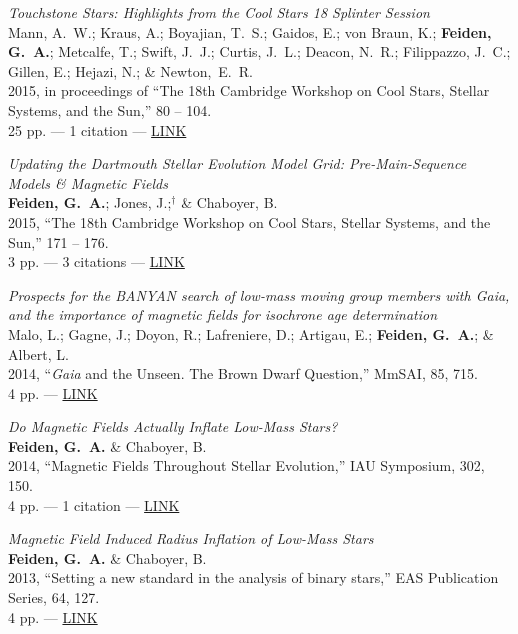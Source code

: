 \documentclass[11pt,a4paper]{article}
\begin{document}
\begin{etaremune}[leftmargin=0.30in]
	\item \emph{Touchstone Stars: Highlights from the Cool Stars 18 Splinter Session} \\
	 Mann, A.~W.; Kraus, A.; Boyajian, T.~S.; Gaidos, E.; von Braun, K.; {\bf Feiden, G.~A.}; Metcalfe, T.; Swift, J.~J.; Curtis, J.~L.; Deacon, N.~R.; Filippazzo, J.~C.; Gillen, E.; Hejazi, N.; \& Newton,~E.~R. \\
	 2015, in proceedings of ``The 18th Cambridge Workshop on Cool Stars, Stellar Systems, and the Sun,'' 80 -- 104. \\
	 25 pp. --- 1 citation --- \href{http://adsabs.harvard.edu/abs/2015csss...18..171F}{LINK}

	\item \emph{Updating the Dartmouth Stellar Evolution Model Grid: Pre-Main-Sequence Models \& Magnetic Fields} \\
	{\bf Feiden, G.~A.}; Jones, J.;$^{\dagger}$ \& Chaboyer, B. \\
	2015, ``The 18th Cambridge Workshop on Cool Stars, Stellar Systems, and the Sun,'' 171 -- 176. \\
	3 pp. --- 3 citations --- \href{http://adsabs.harvard.edu/abs/2015csss...18...80M}{LINK}
	
	\item \emph{Prospects for the BANYAN search of low-mass moving group members with Gaia, and the importance of magnetic fields for isochrone age determination} \\
		Malo, L.; Gagne, J.; Doyon, R.; Lafreniere, D.; Artigau, E.; {\bf Feiden, G.~A.}; \& Albert, L. \\
		2014, ``{\it Gaia} and the Unseen. The Brown Dwarf Question,'' MmSAI, 85, 715. \\
		4 pp. --- \href{http://adsabs.harvard.edu/abs/2014MmSAI..85..715M}{LINK}
		
	\item \emph{Do Magnetic Fields Actually Inflate Low-Mass Stars?} \\
    {\bf Feiden, G.~A.} \& Chaboyer, B. \\
    2014, ``Magnetic Fields Throughout Stellar Evolution,'' IAU Symposium, 302, 150. \\
    4 pp. --- 1 citation --- \href{http://adsabs.harvard.edu/abs/2014IAUS..302..150F}{LINK}

    \item \emph{Magnetic Field Induced Radius Inflation of Low-Mass Stars} \\ 
    {\bf Feiden, G.~A.} \& Chaboyer, B. \\
    2013, ``Setting a new standard in the analysis of binary stars,'' EAS Publication Series, 64, 127. \\
    4 pp. --- \href{http://adsabs.harvard.edu/abs/2013EAS....64..127F/}{LINK}
    

\end{etaremune}
\end{document}
